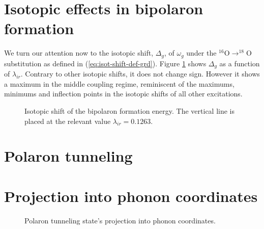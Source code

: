 \section{Isotopic effects in bipolaron formation}
\label{sec:grd-isotopic}

We turn our attention now to the isotopic shift, $\Delta_g$, of $\omega_g$ under the $^{16}$O$\rightarrow ^{18}$O substitution as defined in (\ref{eq:isot-shift-def-grd}).
Figure \ref{fig:isotPolaronFormation} shows $\Delta_g$ as a function of $\lambda_{ir}$.
Contrary to other isotopic shifts, it does not change sign.
However it shows a maximum in the middle coupling regime, reminiscent of the maximums, minimums and inflection points in the isotopic shifts of all other excitations.

\begin{figure}[ht]
  \centering
  
  \caption{Isotopic shift of the bipolaron formation energy. The vertical line is placed at the relevant value $\lambda_{ir}=0.1263$.}
  \label{fig:isotPolaronFormation}
\end{figure}


\section{Polaron tunneling}



\section{Projection into phonon coordinates}

\begin{figure}[ht]
  \centering
  
  \caption{Polaron tunneling state's projection into phonon coordinates.}
  \label{fig:phononProjPol}
\end{figure}
